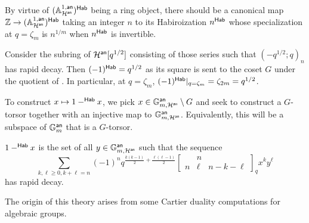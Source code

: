 By virtue of $(\mathbb{A}^{1,\mathsf{an}}_{\mathcal{H}^{\mathsf{an}}})^{\mathsf{Hab}}$ being a ring object, there should be a canonical map $\mathbb{Z}\to (\mathbb{A}^{1,\mathsf{an}}_{\mathcal{H}^{\mathsf{an}}})^{\mathsf{Hab}}$ taking an integer $n$ to its Habiroization $n^{\mathsf{Hab}}$ whose specialization at $q=\zeta_{m}$ is $n^{1/m}$ when $n^{\mathsf{Hab}}$ is invertible. 
\begin{example}
    Consider the subring of $\mathcal{H}^{\mathsf{an}}[q^{1/2}]$ consisting of those series such that $(-q^{1/2};q)_{n}$ has rapid decay. Then $(-1)^{\mathsf{Hab}}=q^{1/2}$ as its square is sent to the coset $G$ under the quotient of . In particular, at $q=\zeta_{m}$, $(-1)^{\mathsf{Hab}}|_{q=\zeta_{m}}=\zeta_{2m}=q^{1/2}$. 
\end{example}
To construct $x\mapsto 1-^{\mathsf{Hab}}x$, we pick $x\in\mathbb{G}_{m,\mathcal{H}^{\mathsf{an}}}^{\mathsf{an}}\setminus G$ and seek to construct a $G$-torsor together with an injective map to $\mathbb{G}_{m,\mathcal{H}^{\mathsf{an}}}^{\mathsf{an}}$. Equivalently, this will be a subspace of $\mathbb{G}_{m}^{\mathsf{an}}$ that is a $G$-torsor. 
\begin{definition}[$1-^{\Hab}x$]\label{def: 1-Habx}
    $1-^{\Hab}x$ is the set of all $y\in\mathbb{G}_{m,\mathcal{H}^{\mathsf{an}}}^{\mathsf{an}}$ such that the sequence 
    $$\sum_{k,\ell\geq0, k+\ell=n}(-1)^{n}q^{\frac{k(k-1)}{2}+\frac{\ell(\ell-1)}{2}}\begin{bmatrix}
    & n & \\
    n & \ell & n-k-\ell
     \end{bmatrix}_{q}x^{k}y^{\ell}$$
    has rapid decay. 
\end{definition}
The origin of this theory arises from some Cartier duality computations for algebraic groups. 